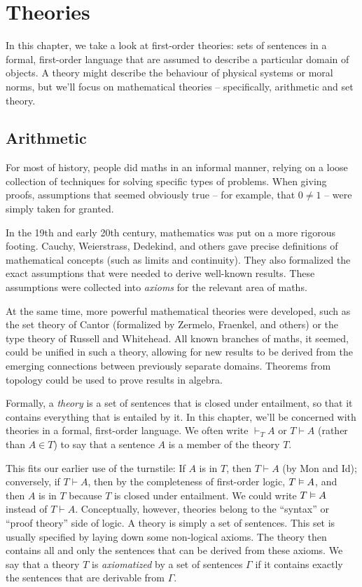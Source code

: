 \setcounter{chapter}{3}
\chapter{Theories}\label{ch:theories}

In this chapter,
we take a look at first-order theories:
sets of sentences in a formal, first-order language that are
assumed to describe a particular domain of objects.
A theory might describe the behaviour of physical systems
or moral norms,
but we'll focus on mathematical theories
-- specifically, arithmetic and set theory.

\section{Arithmetic}\label{sec:arithmetic}

For most of history,
people did maths in an informal manner,
relying on a loose collection of techniques for solving specific types of problems.
When giving proofs,
assumptions that seemed obviously true
-- for example, that $0 \ne 1$ --
were simply taken for granted.

In the 19th and early 20th century,
mathematics was put on a more rigorous footing.
Cauchy, Weierstrass, Dedekind, and others gave
precise definitions of mathematical concepts (such as limits and continuity).
They also formalized the exact assumptions that
were needed to derive well-known results.
These assumptions were collected into \emph{axioms} for the relevant area of maths.

At the same time,
more powerful mathematical theories were developed,
such as the set theory of Cantor
(formalized by Zermelo, Fraenkel, and others)
or the type theory of Russell and Whitehead.
All known branches of maths,
it seemed,
could be unified in such a theory,
allowing for new results to be derived
from the emerging connections between previously separate domains.
Theorems from topology could be used to prove results in algebra.

Formally,
a \emph{theory} is a set of sentences that is closed under entailment,
so that it contains everything that is entailed by it.
In this chapter,
we'll be concerned with theories in a formal, first-order language.
We often write $\vdash_{T} A$ or $T \vdash A$  (rather than $A \in T$)
to say that a sentence $A$ is a member of the theory $T$.

This fits our earlier use of the turnstile:
If $A$ is in $T$,
then $T \vdash A$ (by Mon and Id);
conversely,
if $T \vdash A$,
then by the completeness of first-order logic,
$T \vDash A$,
and then $A$ is in $T$ because $T$ is closed under entailment.
We could write $T \vDash A$ instead of $T \vdash A$.
Conceptually, however,
theories belong to the ``syntax'' or ``proof theory'' side of logic.
A theory is simply a set of sentences.
This set is usually specified by laying down some non-logical axioms.
The theory then contains all and only the sentences
that can be derived from these axioms.
We say that a theory $T$ is \emph{axiomatized} by a set of sentences $\Gamma$
if it contains exactly the sentences that are derivable from $\Gamma$.

